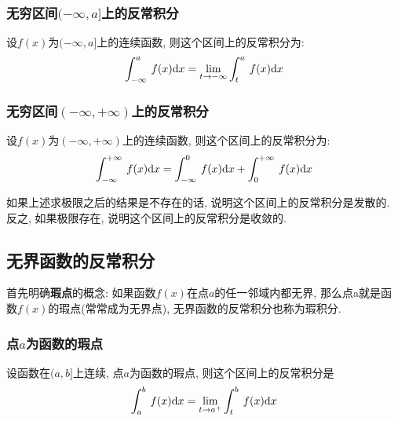                         \subsubsection{无穷区间$ (-\infty,a] $上的反常积分}
                        设$ f(x) $为$ (-\infty,a] $上的连续函数, 则这个区间上的反常积分为:
                \begin{equation*}
                    \displaystyle\int_{-\infty}^{a}\hspace{.2em}f(x)\mathrm{d}x=\lim\limits_{t \rightarrow -\infty}\displaystyle\int_{t}^{a}\hspace{.2em}f(x)\mathrm{d}x
                \end{equation*}
                \subsubsection{无穷区间$ (-\infty,+\infty) $上的反常积分}
                设$ f(x) $为$ (-\infty,+\infty) $上的连续函数, 则这个区间上的反常积分为:
                \begin{equation*}
                    \displaystyle\int_{-\infty}^{+\infty}\hspace{.2em}f(x)\mathrm{d}x=\displaystyle\int_{-\infty}^{0}\hspace{.2em}f(x)\mathrm{d}x+\displaystyle\int_{0}^{+\infty}\hspace{.2em}f(x)\mathrm{d}x
                \end{equation*}
                \begin{tcolorbox}
                    如果上述求极限之后的结果是不存在的话, 说明这个区间上的反常积分是发散的. 反之, 如果极限存在, 说明这个区间上的反常积分是收敛的.
                \end{tcolorbox}
                \subsection{无界函数的反常积分}
                首先明确\textbf{瑕点}的概念: 如果函数$ f(x) $在点$ a $的任一邻域内都无界, 那么点a就是函数$ f(x) $的瑕点(常常成为无界点), 无界函数的反常积分也称为瑕积分.
                \subsubsection{点$ a $为函数的瑕点}
                设函数在$ (a,b] $上连续, 点$ a $为函数的瑕点, 则这个区间上的反常积分是
\begin{equation*}
    \displaystyle\int_{a}^{b}\hspace{.2em}f(x)\mathrm{d}x=\lim\limits_{t \rightarrow a^{+}}\displaystyle\int_{t}^{b}\hspace{.2em}f(x)\mathrm{d}x
\end{equation*}

